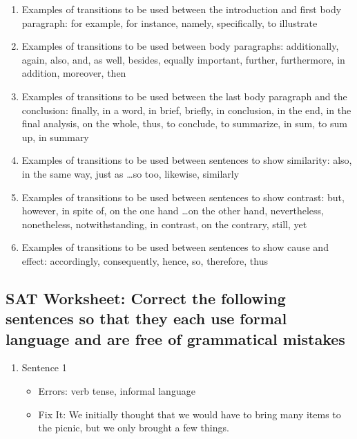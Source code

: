 \begin{enumerate}
\begin{enumerate}
\item Examples of transitions to be used between the introduction and first body paragraph: for example, for instance, namely, specifically, to illustrate

\item Examples of transitions to be used between body paragraphs: additionally, again, also, and, as well, besides, equally important, further, furthermore, in addition, moreover, then

\item Examples of transitions to be used between the last body paragraph and the conclusion: finally, in a word, in brief, briefly, in conclusion, in the end, in the final analysis, on the whole, thus, to conclude, to summarize, in sum, to sum up, in summary

\item Examples of transitions to be used between sentences to show similarity: also, in the same way, just as \ldots so too, likewise, similarly

\item Examples of transitions to be used between sentences to show contrast: but, however, in spite of, on the one hand \ldots on the other hand, nevertheless, nonetheless, notwithstanding, in contrast, on the contrary, still, yet

\item Examples of transitions to be used between sentences to show cause and effect: accordingly, consequently, hence, so, therefore, thus

\end{enumerate}

\subsection{SAT Worksheet: Correct the following sentences so that they each use formal language and are free of grammatical mistakes}

\begin{enumerate}
\item Sentence 1

\begin{itemize}
\item Errors: verb tense, informal language
\item Fix It: We initially thought that we would have to bring many items to the picnic, but we only brought a few things. 
\end{itemize}


\end{enumerate}
\end{enumerate}
